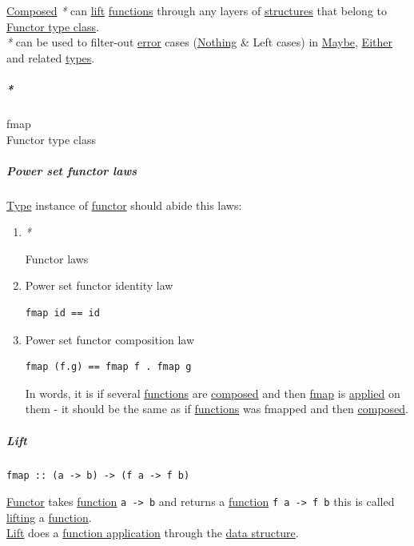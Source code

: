 \documentclass[11pt]{article}
\begin{document}
\hyperref[orgc78ac5d]{Composed} \emph{*} can \hyperref[org47dee33]{lift} \hyperref[orgaa8fb87]{functions} through any layers of \hyperref[orgc87c48c]{structures} that belong to \hyperref[org67c1dcb]{Functor type class}.\\

\emph{*} can be used to filter-out \hyperref[org2b27c5e]{error} cases (\hyperref[org35c2c9d]{Nothing} \& Left cases) in \hyperref[org8347bae]{Maybe}, \hyperref[org6f16842]{Either} and related \hyperref[org4209edd]{types}.\\

\subparagraph{\emph{*}}
\label{sec:org1aa9bd1}

\label{org293a48f}fmap\\
\label{org67c1dcb}Functor type class\\

\subparagraph{\label{orge19c9ea}Power set functor laws}
\label{sec:org1c760df}
\hyperref[orgc4aea2f]{Type} instance of \hyperref[orgf2f6841]{functor} should abide this laws:\\

\begin{enumerate}
\item \emph{*}
\label{sec:orgde62202}

\label{org5c2e0fd}Functor laws\\

\item \label{orgac6d411}Power set functor identity law
\label{sec:orga2cce7e}
\begin{verbatim}
fmap id == id
\end{verbatim}

\item \label{orgf6213a8}Power set functor composition law
\label{sec:org1dd1103}
\begin{verbatim}
fmap (f.g) == fmap f . fmap g
\end{verbatim}
In words, it is if several \hyperref[orgaa8fb87]{functions} are \hyperref[orgc78ac5d]{composed} and then \hyperref[org293a48f]{fmap} is \hyperref[org7abd585]{applied} on them - it should be the same as if \hyperref[orgaa8fb87]{functions} was fmapped and then \hyperref[orgc78ac5d]{composed}.\\
\end{enumerate}

\subparagraph{\label{org47dee33}Lift}
\label{sec:org3418272}
\begin{verbatim}
fmap :: (a -> b) -> (f a -> f b)
\end{verbatim}
\hyperref[orgf2f6841]{Functor} takes \hyperref[orge15bc14]{function} \texttt{a -> b} and returns a \hyperref[orge15bc14]{function} \texttt{f a -> f b} this is called \hyperref[orgc8f2687]{lifting} a \hyperref[orge15bc14]{function}.\\
\hyperref[org47dee33]{Lift} does a \hyperref[org6aac242]{function application} through the \hyperref[org51ce163]{data structure}.\\
\end{document}
